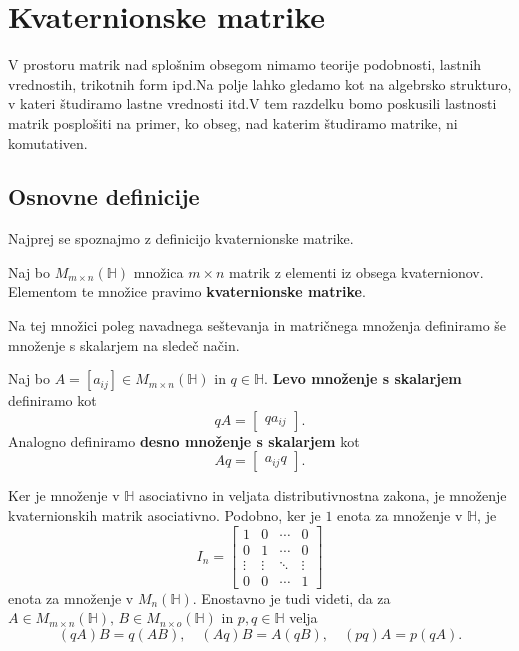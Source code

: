 \documentclass[mat1, tisk]{fmfdelo}
\numberwithin{equation}{section}
\begin{document}
\section{Kvaternionske matrike}

V prostoru matrik nad splošnim obsegom nimamo teorije podobnosti, lastnih vrednostih, trikotnih form ipd.\@ Na polje lahko  
gledamo kot na  algebrsko strukturo, v kateri študiramo lastne vrednosti itd.\@ V tem razdelku bomo poskusili
lastnosti matrik posplošiti na primer, ko obseg, nad katerim študiramo matrike, ni komutativen. 

\subsection{Osnovne definicije}

Najprej se spoznajmo z definicijo kvaternionske matrike.

\begin{definicija}
    Naj bo $M_{m \times n}(\mathbb{H})$ množica $m \times n$ matrik z elementi iz obsega kvaternionov. Elementom te 
    množice pravimo \textbf{kvaternionske matrike}.
\end{definicija}

\noindent
Na tej množici poleg navadnega seštevanja in matričnega množenja definiramo še množenje s skalarjem na sledeč način.

\begin{definicija}
    Naj bo $A = [a_{ij}] \in M_{m \times n}(\mathbb{H})$ in $q \in \mathbb{H}$. \textbf{Levo množenje s skalarjem} definiramo kot
    $$qA = 
    \begin{bmatrix}
        qa_{ij}
    \end{bmatrix}
    .$$
    Analogno definiramo \textbf{desno množenje s skalarjem} kot
    $$Aq = \begin{bmatrix}
        a_{ij}q
    \end{bmatrix}
    .$$
\end{definicija}

Ker je množenje v $\mathbb{H}$ asociativno in veljata distributivnostna zakona, je množenje kvaternionskih matrik asociativno. Podobno, ker je $1$ enota za množenje v $\mathbb{H}$,
je 
\[I_n =
\begin{bmatrix}
1 & 0  & \cdots & 0 \\
0 & 1  & \cdots & 0 \\
\vdots & \vdots & \ddots & \vdots \\
0 & 0  & \cdots & 1
\end{bmatrix}
\]
enota za množenje v $M_{n}(\mathbb{H})$. Enostavno je tudi videti, da za $A \in M_{m \times n}(\mathbb{H}), \, B \in M_{n \times o}(\mathbb{H})$ in $p, q \in \mathbb{H}$ velja
$$(qA)B = q(AB), \quad
(Aq)B = A(qB), \quad
(pq)A = p(qA).$$
\end{document}
